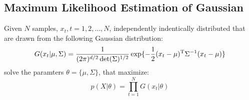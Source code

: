 \subsection{Maximum Likelihood Estimation of Gaussian}
Given $N$ samples, $x_t, t=1,2,\dots,N$, independently indentically distributed
that are drawn from the following Gaussian distribution:
\begin{equation}
	G(x_t|\mu, \Sigma) = \frac{1}{(2\pi)^{d/2}\det(\Sigma)^{1/2}}
	\exp\{ -\frac{1}{2} (x_t-\mu)^\mathrm{T}\Sigma^{-1}(x_t-\mu)\} 
	\label{eq:gaussian_gen}
\end{equation}
solve the paramters $\theta=\{\mu, \Sigma\}$, that maximize:
\begin{equation}
	p(X|\theta) = \prod_{t=1}^{N} G(x_t|\theta) 
\end{equation}

